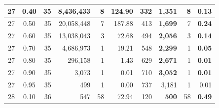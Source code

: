 \begin{table}[H]
\begin{tabular}{|c|c|r|r|r|r|r|r|r|r|}
        27                              & 0.40                               & 35                                              & 8,436,433                                        & 8             & 124.90        & 332           & \textbf{1,351}   & 8             & \textbf{0.13} \\ \hline
        27                              & 0.50                               & 35                                              & 20,058,448                                       & 7             & 187.88        & 413           & \textbf{1,699}   & 7             & \textbf{0.24} \\ \hline
        27                              & 0.60                               & 35                                              & 13,038,043                                       & 3             & 72.68         & 494           & \textbf{2,056}   & 3             & \textbf{0.14} \\ \hline
        27                              & 0.70                               & 35                                              & 4,686,973                                        & 1             & 19.21         & 548           & \textbf{2,299}   & 1             & \textbf{0.05} \\ \hline
        27                              & 0.80                               & 35                                              & 296,158                                          & 1             & 1.43          & 629           & \textbf{2,671}   & 1             & \textbf{0.01} \\ \hline
        27                              & 0.90                               & 35                                              & 3,073                                            & 1             & 0.01          & 710           & \textbf{3,052}   & 1             & \textbf{0.01} \\ \hline
        27                              & 0.95                               & 35                                              & 499                                              & 1             & 0.00          & 737           & 3,181            & 1             & 0.01          \\ \hline
        28                              & 0.10                               & 36                                              & 547                                              & 58            & 72.94         & 120           & \textbf{ 500}    & 58            & \textbf{0.49} \\ \hline

\end{tabular}
\end{table}
